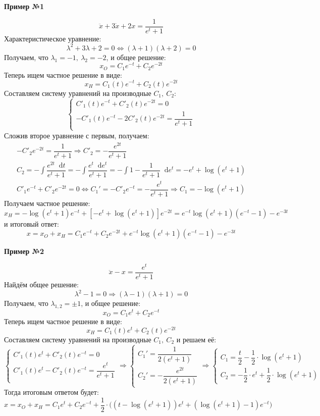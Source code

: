 \documentclass[a4paper,12pt]{article}
\renewcommand*\d{\mathop{}\!\mathrm{d}}
\newcommand{\dx}{\dot{x}}
\newcommand{\ddx}{\ddot{x}}
\newcommand{\bto}{\Longrightarrow}
\newcommand{\ds}{\displaystyle}
\begin{document}
\textbf{Пример №1}

\[\ddx + 3\dx + 2x = \dfrac{1}{e^t + 1}\]
Характеристическое уравнение:
\[\lambda^2 + 3\lambda + 2 = 0 \iff (\lambda + 1)(\lambda + 2) = 0\]
Получаем, что $\lambda_1 = -1,\ \lambda_2 = -2$, и общее решение:
\[x_O = C_1e^{-t} + C_2e^{-2t}\]
Теперь ищем частное решение в  виде:
\[x_H = C_1(t)e^{-t} + C_2(t)e^{-2t}\]
Составляем систему уравнений на производные $C_1,\ C_2$:
\[\begin{cases}
C'_1(t)e^{-t} + C'_2(t)e^{-2t}  = 0\\
-C'_1(t)e^{-t} - 2C'_2(t)e^{-2t}  = \dfrac{1}{e^t + 1} \\
\end{cases}\]
Сложив второе уравнение с первым, получаем:
\begin{gather*}
	-C'_2e^{-2t} = \dfrac{1}{e^t + 1} \bto C'_2 = -\dfrac{e^{2t}}{e^t + 1} \\ C_2 = -\ds\int\dfrac{e^{2t}\d t}{e^t + 1} = -\ds\int\dfrac{e^{t}\d e^t}{e^t + 1} = -\ds\int 1 - \dfrac{1}{e^t + 1}\d e^t = -e^t + \log(e^t + 1)\\
	C'_1e^{-t} + C'_2e^{-2t}  = 0 \iff C_1' = -C'_2 e^{-t} = -\dfrac{e^t}{e^t + 1} \bto C_1 = -\log(e^t + 1)
\end{gather*}
Получаем частное решение:
\[x_H = -\log(e^t + 1)e^{-t} + \left[-e^t + \log(e^t + 1)\right]e^{-2t} = e^{-t}\log(e^t + 1)\left(e^{-t} - 1\right) - e^{-3t}\]
и итоговый ответ:
\[x = x_O + x_H = C_1e^{-t} + C_2e^{-2t} + e^{-t}\log(e^t + 1)\left(e^{-t} - 1\right) - e^{-3t}\]

\textbf{Пример №2}

\[\ddx - x = \dfrac{e^t}{e^t + 1}\]
Найдём общее решение:
\[\lambda^2 - 1 = 0 \bto (\lambda - 1)(\lambda + 1) = 0\]
Получаем, что $\lambda_{1,2} = \pm 1$,  и общее решение:
\[x_O = C_1e^t + C_2e^{-t}\]
Теперь ищем частное решение в  виде:
\[x_H = C_1(t)e^{t} + C_2(t)e^{-2t}\]
Составляем систему уравнений на производные $C_1,\ C_2$ и решаем её:
\[\begin{cases}
C'_1(t)e^{t} + C'_2(t)e^{-t}  = 0\\
C'_1(t)e^{t} - C'_2(t)e^{-t}  = \dfrac{e^t}{e^t + 1} \\
\end{cases} \bto \begin{cases}
	C_1' = \dfrac{1}{2(e^t + 1)}\\
	C_2' = -\dfrac{e^{2t}}{2(e^t + 1)}
\end{cases} \bto \begin{cases}
	C_1 = \dfrac{t}{2}  - \dfrac{1}{2}\cdot \log(e^t + 1)\\
	C_2 = -\dfrac{1}{2} \cdot e^t + \dfrac{1}{2} \cdot \log(e^t + 1)
\end{cases}\]
Тогда итоговым ответом будет:
\[x = x_O + x_H = C_1e^t + C_2e^{-t} + \dfrac{1}{2} \cdot \Big((t - \log(e^t + 1))e^t + (\log(e^t + 1) - 1)e^{-t}\Big) \]
\end{document}
